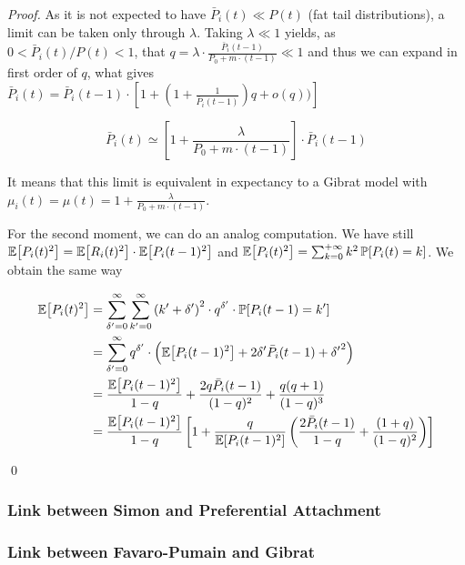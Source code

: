 \begin{proof}
As it is not expected to have $\bar{P}_i(t)\ll P(t)$ (fat tail distributions), a limit can be taken only through $\lambda$. Taking $\lambda \ll 1$ yields, as $0 < \bar{P}_i(t)/P(t) < 1$, that $q=\lambda\cdot\frac{\bar{P}_i(t-1)}{P_0 + m\cdot (t-1)} \ll 1$ and thus we can expand in first order of $q$, what gives $\bar{P}_i(t)=\bar{P}_i(t-1)\cdot \left[1 + \left(1+\frac{1}{\bar{P}_i(t-1)}\right)q + o(q))\right]$

\[
\bar{P}_i(t) \simeq \left[1 + \frac{\lambda}{P_0 + m\cdot (t-1)}\right]\cdot \bar{P}_i(t-1)
\]

It means that this limit is equivalent in expectancy to a Gibrat model with $\mu_i(t) = \mu(t)=1 + \frac{\lambda}{P_0 + m\cdot (t-1)}$.

For the second moment, we can do an analog computation. We have still $\operatorname{\mathbb{E}}\!\left[P_i(t)^2\right] = \operatorname{\mathbb{E}}\!\left[R_i(t)^2\right]\cdot \operatorname{\mathbb{E}}\!\left[P_i(t-1)^2\right]$ and $\operatorname{\mathbb{E}}\!\left[P_i(t)^2\right]=\sum_{k=0}^{+\infty}{k^2 \operatorname{\mathbb{P}}\!\left[P_i(t)=k\right]}$. We obtain the same way 

\[
\begin{split}
\operatorname{\mathbb{E}}\!\left[P_i(t)^2\right] & = \sum_{\delta^{\prime}=0}^{\infty}{\sum_{k^{\prime}=0}^{\infty}{\left(k^\prime + \delta^{\prime}\right)^2\cdot q^{\delta^{\prime}} \cdot \operatorname{\mathbb{P}}\!\left[P_i(t-1)=k^\prime\right]}}\\ 
& = \sum_{\delta^{\prime}=0}^{\infty}{q^{\delta^{\prime}}\cdot \left(\operatorname{\mathbb{E}}\!\left[P_i(t-1)^2\right]+2\delta^{\prime}\bar{P}_i(t-1) + {\delta^{\prime}}^2\right)}\\
& = \frac{\operatorname{\mathbb{E}}\!\left[P_i(t-1)^2\right]}{1-q} + \frac{2 q \bar{P}_i(t-1)}{(1-q)^2} + \frac{q(q+1)}{(1-q)^3}\\
& = \frac{\operatorname{\mathbb{E}}\!\left[P_i(t-1)^2\right]}{1-q}\left[1 + \frac{q}{\operatorname{\mathbb{E}}\!\left[P_i(t-1)^2\right]}\left(\frac{2\bar{P}_i(t-1)}{1-q} + \frac{(1+q)}{(1-q)^2}\right)\right]
\end{split}
\]

\qed

\end{proof}




\subsubsection{Link between Simon and Preferential Attachment}
\label{subsubsec:gibrat-simon}


\subsubsection{Link between Favaro-Pumain and Gibrat}

\cite{favaro2011gibrat}

